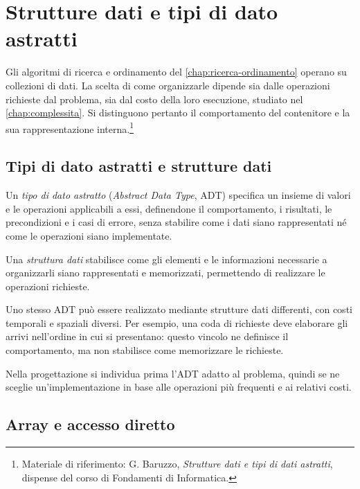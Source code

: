 \chapter{Strutture dati e tipi di dato astratti}
\label{chap:strutture-dati-adt}

Gli algoritmi di ricerca e ordinamento del \cref{chap:ricerca-ordinamento}
operano su collezioni di dati. La scelta di come organizzarle dipende
sia dalle operazioni richieste dal problema, sia dal costo della loro
esecuzione, studiato nel \cref{chap:complessita}. Si distinguono pertanto
il comportamento del contenitore e la sua rappresentazione interna.\footnote{Materiale
di riferimento: G. Baruzzo, \emph{Strutture dati e tipi di dati astratti},
dispense del corso di Fondamenti di Informatica.}

\section{Tipi di dato astratti e strutture dati}
\label{sec:fi-adt-strutture}

\begin{definition}
\label{def:fi-adt}
Un \emph{tipo di dato astratto} (\emph{Abstract Data Type}, ADT)
specifica un insieme di valori e le operazioni applicabili a essi,
definendone il comportamento, i risultati, le precondizioni e i casi
di errore, senza stabilire come i dati siano rappresentati né come
le operazioni siano implementate.
\end{definition}

\begin{definition}
\label{def:fi-struttura-dati}
Una \emph{struttura dati} stabilisce come gli elementi e le
informazioni necessarie a organizzarli siano rappresentati e
memorizzati, permettendo di realizzare le operazioni richieste.
\end{definition}

Uno stesso ADT può essere realizzato mediante strutture dati
differenti, con costi temporali e spaziali diversi. Per esempio,
una coda di richieste deve elaborare gli arrivi nell'ordine in cui
si presentano: questo vincolo ne definisce il comportamento, ma
non stabilisce come memorizzare le richieste.

Nella progettazione si individua prima l'ADT adatto al problema,
quindi se ne sceglie un'implementazione in base alle operazioni
più frequenti e ai relativi costi.

\section{Array e accesso diretto}
\label{sec:fi-strutture-array}


